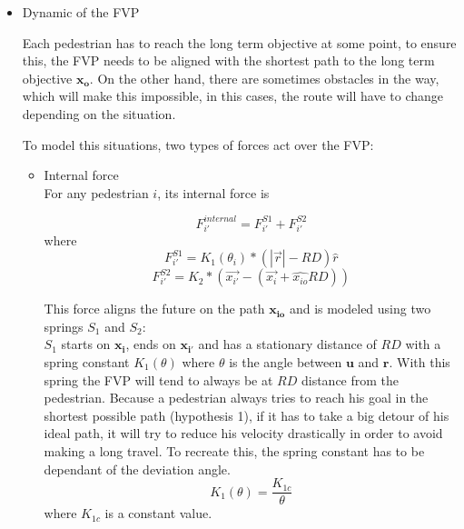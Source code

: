 \documentclass[english]{article}
\begin{document}
    \begin{itemize}
    \item Dynamic of the FVP
        
        Each pedestrian has to reach the long term objective at some point,
        to ensure this, the FVP needs to be aligned with the shortest path
        to the long term objective $\mathbf{x_{o}}$. On the other hand, there
        are sometimes obstacles in the way, which will make this impossible,
        in this cases, the route will have to change depending on the situation.
        
        To model this situations, two types of forces act over the FVP: 
        
        \begin{itemize}
        \item Internal force \\
            
            For any pedestrian $i$, its internal force is
            
            \begin{equation}
                F_{i'}^{internal} = F_{i'}^{S1} + F_{i'}^{S2}
            \end{equation}
            where
            \[
                F_{i'}^{S1} = K_{1}(\theta_{i}) * (|\vec{r}| - RD) \hat{r}
            \]
            \[
                F_{i'}^{S2} = K_{2} * (\vec{x_{i'}} - (\vec{x_{i}} + \hat{x_{io}} RD))
            \]
            
            This force aligns the future on the path $\mathbf{x_{io}}$ and is modeled using 
            two springs $S_1$ and $S_2$:\\
            
            $S_1$ starts on $\mathbf{x_{i}}$, ends on $\mathbf{x_{i'}}$ and 
            has a stationary distance of $RD$ with a spring constant $K_{1}(\theta)$ 
            where $\theta$ is the angle between $\mathbf{u}$ and $\mathbf{r}$. With this 
            spring the FVP will tend to always be at $RD$ distance from the pedestrian.
            Because a pedestrian always tries to reach his goal in the shortest
            possible path (hypothesis 1), if it has to take a big detour of his
            ideal path, it will try to reduce his velocity drastically in order
            to avoid making a long travel. To recreate this, the spring constant
            has to be dependant of the deviation angle.
            \[
                K_{1}(\theta) = \frac{K_{1c}}{\theta}
            \]
            where $K_{1c}$ is a constant value.
            

\end{itemize}
\end{itemize}
\end{document}
